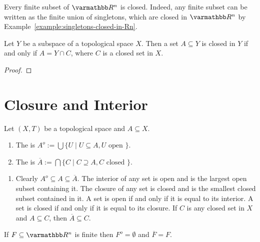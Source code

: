 \begin{example}
    Every finite subset of $\bfR^n$ is closed. Indeed, any finite subset can be written as the finite union of singletons, which are closed in $\bfR^n$ by Example~\ref{example:singletons-closed-in-Rn}.
\end{example}

\begin{proposition}
    Let $Y$ be a subspace of a topological space $X$. Then a set $A \subseteq Y$ is closed in $Y$ if and only if $A = Y \cap C$, where $C$ is a closed set in $X$.
\end{proposition}
    {\color{red} \begin{proof}
        
    \end{proof}}

\section{Closure and Interior}

\begin{definition}
    Let $(X,T)$ be a topological space and $A\subseteq X$.
    \begin{enumerate}[label = (\arabic*),itemsep=1pt,topsep=3pt]
        \item The  is $A^o := \bigcup \{U \mid U \subseteq A, U \text{ open }\}$.
        \item The  is $\overline{A} := \bigcap\{C \mid C \supseteq A, C \text{ closed }\}$.
    \end{enumerate}
\end{definition}

\begin{remark}
\phantom{a}
\begin{enumerate}[label = (\arabic*),itemsep=1pt,topsep=3pt]
    \item Clearly $A^o \subseteq A \subseteq \overline{A}$. The interior of any set is open and is the largest open subset containing it. The closure of any set is closed and is the smallest closed subset contained in it. A set is open if and only if it is equal to its interior. A set is closed if and only if it is equal to its closure. If $C$ is any closed set in $X$ and $A \subseteq C$, then $\overline{A} \subseteq C$.
\end{enumerate}
\end{remark}

\begin{example}
    If $F \subseteq \bfR^n$ is finite then $F^o = \emptyset$ and $\overline{F} = F$.
\end{example}

